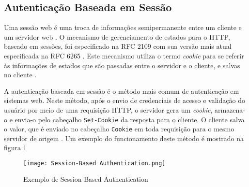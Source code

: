 \subsection{Autenticação Baseada em Sessão}

Uma sessão web é uma troca de informações semipermanente entre um cliente e um servidor web 
\cite{CALZAVARA2017}. O mecanismo de gerenciamento de estados para o HTTP, baseado em sessões, foi 
especificado na RFC 2109 \cite{RFC2109} com sua versão mais atual especificada na RFC 6265 
\cite{RFC6265}. Este mecanismo utiliza o termo \emph{cookie} para se referir às informações de 
estados que são passadas entre o servidor e o cliente, e salvas no cliente \cite{RFC2109}. 

A autenticação baseada em sessão é o método mais comum de autenticação em sistemas web. Neste 
método, após o envio de credenciais de acesso e validação do usuário por meio de uma requisição 
HTTP, o servidor gera um \emph{cookie}, armazena-o e envia-o pelo cabeçalho \texttt{Set-Cookie} da 
resposta para o cliente. O cliente salva o valor, que é enviado no cabeçalho \texttt{Cookie} em 
toda requisição para o mesmo servidor de origem \cite{PAPATHANASAKI2022}. Um exemplo do 
funcionamento deste método é mostrado na figura \ref{fig:sessionAuth}

\begin{figure}[ht]
  \centering
  \texttt{[image: Session-Based Authentication.png]}
  \caption{Exemplo de Session-Based Authentication}
  \label{fig:sessionAuth}
\end{figure}